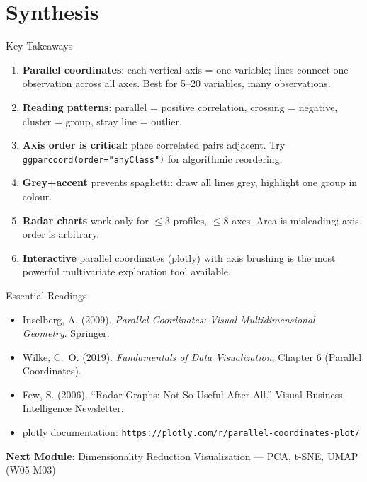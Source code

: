 \documentclass[10pt]{beamer}
\begin{document}
\section{Synthesis}

\begin{frame}{Key Takeaways}
  \begin{enumerate}
    \item \textbf{Parallel coordinates}: each vertical axis = one
          variable; lines connect one observation across all axes.
          Best for 5--20 variables, many observations.
    \item \textbf{Reading patterns}: parallel = positive correlation,
          crossing = negative, cluster = group, stray line = outlier.
    \item \textbf{Axis order is critical}: place correlated pairs
          adjacent. Try \texttt{ggparcoord(order="anyClass")} for
          algorithmic reordering.
    \item \textbf{Grey+accent} prevents spaghetti: draw all lines grey,
          highlight one group in colour.
    \item \textbf{Radar charts} work only for $\leq$3 profiles,
          $\leq$8 axes. Area is misleading; axis order is arbitrary.
    \item \textbf{Interactive} parallel coordinates (plotly) with
          axis brushing is the most powerful multivariate exploration
          tool available.
  \end{enumerate}
\end{frame}

\begin{frame}{Essential Readings}
  \begin{itemize}
    \item Inselberg, A. (2009). \emph{Parallel Coordinates: Visual
          Multidimensional Geometry}. Springer.
    \item Wilke, C.~O. (2019). \emph{Fundamentals of Data Visualization},
          Chapter 6 (Parallel Coordinates).
    \item Few, S. (2006). ``Radar Graphs: Not So Useful After All.''
          Visual Business Intelligence Newsletter.
    \item plotly documentation: \texttt{https://plotly.com/r/parallel-coordinates-plot/}
  \end{itemize}
  \vspace{6pt}
  \textbf{Next Module}: Dimensionality Reduction Visualization ---
  PCA, t-SNE, UMAP (W05-M03)
\end{frame}
\end{document}
